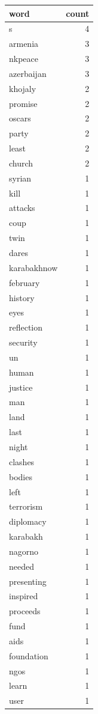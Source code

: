\begin{tabular}{lr}
\toprule
word & count \\
\midrule
s & 4 \\
armenia & 3 \\
nkpeace & 3 \\
azerbaijan & 3 \\
khojaly & 2 \\
promise & 2 \\
oscars & 2 \\
party & 2 \\
least & 2 \\
church & 2 \\
syrian & 1 \\
kill & 1 \\
attacks & 1 \\
coup & 1 \\
twin & 1 \\
dares & 1 \\
karabakhnow & 1 \\
february & 1 \\
history & 1 \\
eyes & 1 \\
reflection & 1 \\
security & 1 \\
un & 1 \\
human & 1 \\
justice & 1 \\
man & 1 \\
land & 1 \\
last & 1 \\
night & 1 \\
clashes & 1 \\
bodies & 1 \\
left & 1 \\
terrorism & 1 \\
diplomacy & 1 \\
karabakh & 1 \\
nagorno & 1 \\
needed & 1 \\
presenting & 1 \\
inspired & 1 \\
proceeds & 1 \\
fund & 1 \\
aids & 1 \\
foundation & 1 \\
ngos & 1 \\
learn & 1 \\
user & 1 \\

\end{tabular}
